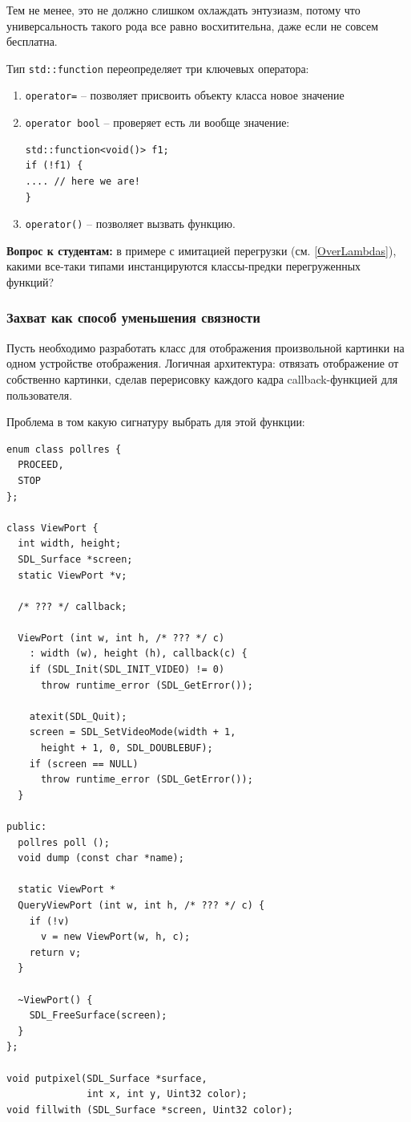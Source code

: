 \documentclass[a4paper,12pt,oneside]{article}
\begin{document}
Тем не менее, это не должно слишком охлаждать энтузиазм, потому что универсальность такого рода все равно восхитительна, даже если не совсем бесплатна.

Тип \lstinline!std::function! переопределяет три ключевых оператора:

\begin{enumerate}
\item\lstinline!operator=! -- позволяет присвоить объекту класса новое значение

\item\lstinline!operator bool! -- проверяет есть ли вообще значение:

\begin{lstlisting}
std::function<void()> f1;
if (!f1) {
.... // here we are!
}
\end{lstlisting}

\item\lstinline!operator()! -- позволяет вызвать функцию.
\end{enumerate}

\textbf{Вопрос к студентам:} в примере с имитацией перегрузки (см. \ref{OverLambdas}), какими все-таки типами инстанцируются классы-предки перегруженных функций?

\subsubsection{Захват как способ уменьшения связности}

Пусть необходимо разработать класс для отображения произвольной картинки на одном устройстве отображения. Логичная архитектура: отвязать отображение от собственно картинки, сделав перерисовку каждого кадра callback-функцией для пользователя.

Проблема в том какую сигнатуру выбрать для этой функции:

\begin{lstlisting}
enum class pollres {
  PROCEED,
  STOP
};

class ViewPort {
  int width, height;
  SDL_Surface *screen;
  static ViewPort *v;

  /* ??? */ callback;

  ViewPort (int w, int h, /* ??? */ c)
    : width (w), height (h), callback(c) {
    if (SDL_Init(SDL_INIT_VIDEO) != 0)
      throw runtime_error (SDL_GetError());

    atexit(SDL_Quit);
    screen = SDL_SetVideoMode(width + 1, 
      height + 1, 0, SDL_DOUBLEBUF);
    if (screen == NULL)
      throw runtime_error (SDL_GetError());
  }

public:
  pollres poll ();
  void dump (const char *name);

  static ViewPort *
  QueryViewPort (int w, int h, /* ??? */ c) {
    if (!v)
      v = new ViewPort(w, h, c);
    return v;
  }

  ~ViewPort() {
    SDL_FreeSurface(screen);
  }
};

void putpixel(SDL_Surface *surface, 
              int x, int y, Uint32 color);
void fillwith (SDL_Surface *screen, Uint32 color);
\end{lstlisting}
\end{document}
